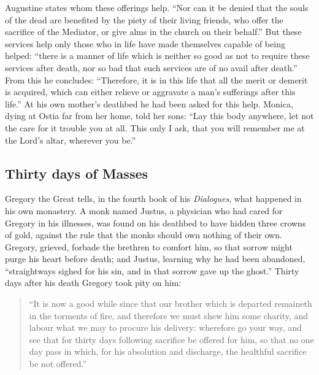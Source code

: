Augustine states whom these offerings help. ``Nor can it be denied that the souls of the dead are benefited by the piety of their living friends, who offer the sacrifice of the Mediator, or give alms in the church on their behalf.'' But these services help only those who in life have made themselves capable of being helped: ``there is a manner of life which is neither so good as not to require these services after death, nor so bad that such services are of no avail after death.'' From this he concludes: ``Therefore, it is in this life that all the merit or demerit is acquired, which can either relieve or aggravate a man's sufferings after this life.'' At his own mother's deathbed he had been asked for this help. Monica, dying at Ostia far from her home, told her sons: ``Lay this body anywhere, let not the care for it trouble you at all. This only I ask, that you will remember me at the Lord's altar, wherever you be.''

\subsection{Thirty days of Masses}

Gregory the Great tells, in the fourth book of his \emph{Dialogues}, what happened in his own monastery. A monk named Justus, a physician who had cared for Gregory in his illnesses, was found on his deathbed to have hidden three crowns of gold, against the rule that the monks should own nothing of their own. Gregory, grieved, forbade the brethren to comfort him, so that sorrow might purge his heart before death; and Justus, learning why he had been abandoned, ``straightways sighed for his sin, and in that sorrow gave up the ghost.'' Thirty days after his death Gregory took pity on him:

\begin{quote}
``It is now a good while since that our brother which is departed remaineth in the torments of fire, and therefore we must shew him some charity, and labour what we may to procure his delivery: wherefore go your way, and see that for thirty days following sacrifice be offered for him, so that no one day pass in which, for his absolution and discharge, the healthful sacrifice be not offered.''
\end{quote}

